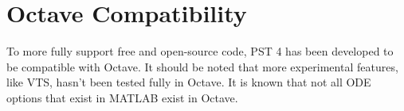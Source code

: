 \section{Octave Compatibility}
To more fully support free and open-source code, PST 4 has been developed to be compatible with Octave.
It should be noted that more experimental features, like VTS, hasn't been tested fully in Octave.
It is known that not all ODE options that exist in MATLAB exist in Octave.
